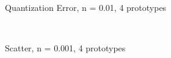 \documentclass[10pt,a4paper]{article}
\begin{document}
\begin{figure}
  \centering
{} \\
  \caption{Quantization Error, n = 0.01, 4 prototypes}
  \label{fig:n001_k4_learning}
\end{figure}

\begin{figure}
  \centering
{} \\
  \caption{Scatter, n = 0.001, 4 prototypes}
  \label{fig:n0001_k4}
\end{figure}
\end{document}
